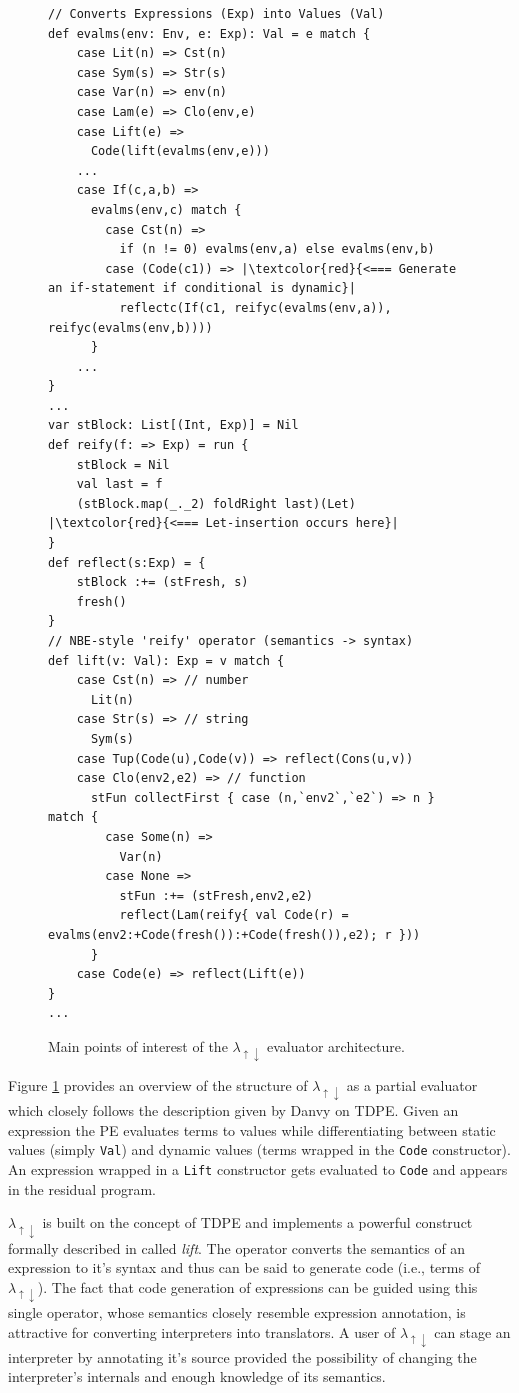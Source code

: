 \documentclass[a4paper,12pt,twoside,openright]{report}
\theoremstyle{definition}
\newcommand{\mslang}{$\lambda_{\uparrow\downarrow}$}
\begin{document}
\begin{figure}
    \centering
    \begin{verbatim}
// Converts Expressions (Exp) into Values (Val)
def evalms(env: Env, e: Exp): Val = e match {
    case Lit(n) => Cst(n)
    case Sym(s) => Str(s)
    case Var(n) => env(n)
    case Lam(e) => Clo(env,e)
    case Lift(e) =>
      Code(lift(evalms(env,e)))
    ...
    case If(c,a,b) =>
      evalms(env,c) match {
        case Cst(n) => 
          if (n != 0) evalms(env,a) else evalms(env,b)
        case (Code(c1)) => |\textcolor{red}{<=== Generate an if-statement if conditional is dynamic}|
          reflectc(If(c1, reifyc(evalms(env,a)), reifyc(evalms(env,b))))
      }
    ...
}
...
var stBlock: List[(Int, Exp)] = Nil
def reify(f: => Exp) = run {
    stBlock = Nil
    val last = f
    (stBlock.map(_._2) foldRight last)(Let) |\textcolor{red}{<=== Let-insertion occurs here}|
}
def reflect(s:Exp) = {
    stBlock :+= (stFresh, s)
    fresh()
}
// NBE-style 'reify' operator (semantics -> syntax)
def lift(v: Val): Exp = v match {
    case Cst(n) => // number
      Lit(n)
    case Str(s) => // string
      Sym(s)
    case Tup(Code(u),Code(v)) => reflect(Cons(u,v))
    case Clo(env2,e2) => // function
      stFun collectFirst { case (n,`env2`,`e2`) => n } match {
        case Some(n) =>
          Var(n)
        case None =>
          stFun :+= (stFresh,env2,e2)
          reflect(Lam(reify{ val Code(r) = evalms(env2:+Code(fresh()):+Code(fresh()),e2); r }))
      }
    case Code(e) => reflect(Lift(e))
}
...
    \end{verbatim}
    \caption{Main points of interest of the \mslang{} evaluator architecture.}
    \label{lst:evalms}
\end{figure}

Figure \ref{lst:evalms} provides an overview of the structure of \mslang{} as a partial evaluator which closely follows the description given by Danvy \cite{danvy1999type} on TDPE. Given an expression the PE evaluates terms to values while differentiating between static values (simply \texttt{Val}) and dynamic values (terms wrapped in the \texttt{Code} constructor). An expression wrapped in a \texttt{Lift} constructor gets evaluated to \texttt{Code} and appears in the residual program. 

\mslang{} is built on the concept of TDPE and implements a powerful construct formally described in \cite{berger1998normalization} called \textit{lift}. The operator converts the semantics of an expression to it's syntax and thus can be said to generate code (i.e., terms of \mslang). The fact that code generation of expressions can be guided using this single operator, whose semantics closely resemble expression annotation, is attractive for converting interpreters into translators. A user of \mslang{} can stage an interpreter by annotating it's source provided the possibility of changing the interpreter's internals and enough knowledge of its semantics.
\end{document}

